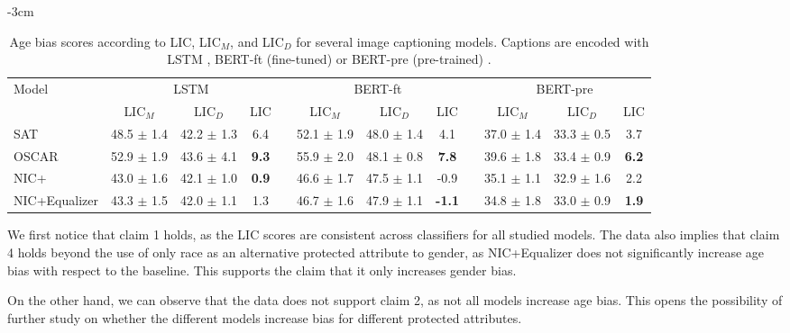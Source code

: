 \begin{table}[hbt]

\footnotesize
\centering
\addtolength{\leftskip} {-3cm}
\addtolength{\rightskip}{-3cm}

\begingroup
\setlength{\tabcolsep}{3pt} %
\renewcommand{\arraystretch}{1.2} %

\begin{tabular}{lccccccccccc}
\hline
\multirow{2}{*}{Model} & \multicolumn{3}{c}{LSTM} & & \multicolumn{3}{c}{BERT-ft} & & \multicolumn{3}{c}{BERT-pre} \\ \cline{2-4} \cline{6-8} \cline{10-12} 
                               & LIC$_M$        & LIC$_D$ & LIC & & LIC$_M$  & LIC$_D$  & LIC & & LIC$_M$  & LIC$_D$  & LIC  \\ \hline
SAT \cite{SAT}                 & 48.5 $\pm$ 1.4 & 42.2 $\pm$ 1.3 & 6.4 & & 52.1 $\pm$ 1.9 & 48.0 $\pm$ 1.4 & 4.1 & & 37.0 $\pm$ 1.4 & 33.3 $\pm$ 0.5 & 3.7 \\
OSCAR  \cite{OSCAR}            & 52.9 $\pm$ 1.9 & 43.6 $\pm$ 4.1 & \textbf{\color{red}9.3} & & 55.9 $\pm$ 2.0 & 48.1 $\pm$ 0.8 & \textbf{\color{red}7.8} & & 39.6 $\pm$ 1.8 & 33.4 $\pm$ 0.9 & \textbf{\color{red}6.2} \\
NIC+ \cite{Burns2018}          & 43.0 $\pm$ 1.6 & 42.1 $\pm$ 1.0 & \textbf{\color{green}0.9} & & 46.6 $\pm$ 1.7 & 47.5 $\pm$ 1.1 & -0.9 & & 35.1 $\pm$ 1.1 & 32.9 $\pm$ 1.6 & 2.2 \\
NIC+Equalizer \cite{Burns2018} & 43.3 $\pm$ 1.5 & 42.0 $\pm$ 1.1 & 1.3 & & 46.7 $\pm$ 1.6 & 47.9 $\pm$ 1.1 & \textbf{\color{green}-1.1} & & 34.8 $\pm$ 1.8 & 33.0 $\pm$ 0.9 & \textbf{\color{green}1.9} \\ \hline
\end{tabular}
\caption{Age bias scores according to LIC, LIC$_M$, and LIC$_D$ for several image captioning models. Captions are encoded with LSTM \cite{LSTM}, BERT-ft (fine-tuned) or BERT-pre (pre-trained) \cite{BERT}.}
\label{table:age-bias}
\endgroup
\end{table}

We first notice that claim 1 holds, as the LIC scores are consistent across classifiers for all studied models. The data also implies that claim 4 holds beyond the use of only race as an alternative protected attribute to gender, as NIC+Equalizer \cite{Burns2018} does not significantly increase age bias with respect to the baseline. This supports the claim that it only increases gender bias.

On the other hand, we can observe that the data does not support claim 2, as not all models increase age bias. This opens the possibility of further study on whether the different models increase bias for different protected attributes.

